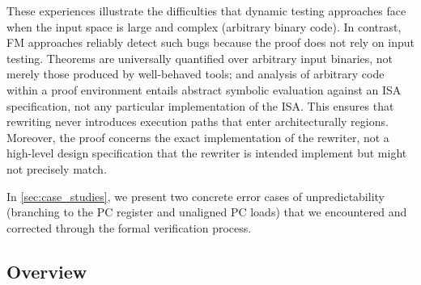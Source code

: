 {  These experiences illustrate the difficulties that dynamic testing approaches face when the input space is large and complex (\eg arbitrary binary code).
  In contrast, FM approaches reliably detect such bugs because the proof does not rely on input testing.
  Theorems are universally quantified over arbitrary input binaries, not merely those produced by well-behaved tools;
  and analysis of arbitrary code within a proof environment entails abstract symbolic evaluation against an ISA specification, not any particular implementation of the ISA\@.
  This ensures that rewriting never introduces execution paths that enter architecturally
  \unpredictable{} regions.
  Moreover, the proof concerns the exact implementation of the rewriter, not a high-level design specification that the rewriter is intended implement but might not precisely match.

  In \autoref{sec:case_studies}, we present two concrete error cases of unpredictability (branching to the PC register and unaligned PC loads) that we encountered and corrected through the formal verification process.
}

\subsection{\pname Overview}

